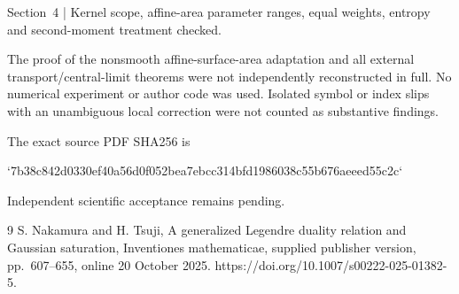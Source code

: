 \documentclass[10pt]{article}
\begin{document}
Section 4 | Kernel scope, affine-area parameter ranges, equal weights, entropy and second-moment treatment checked.\par
The proof of the nonsmooth affine-surface-area adaptation and all external transport/central-limit theorems were not independently reconstructed in full. No numerical experiment or author code was used. Isolated symbol or index slips with an unambiguous local correction were not counted as substantive findings.\par
The exact source PDF SHA256 is\par
`7b38c842d0330ef40a56d0f052bea7ebcc314bfd1986038c55b676aeeed55c2c`\par
Independent scientific acceptance remains pending.\par
9 S. Nakamura and H. Tsuji, A generalized Legendre duality relation and Gaussian saturation, Inventiones mathematicae, supplied publisher version, pp. 607–655, online 20 October 2025. https://doi.org/10.1007/s00222-025-01382-5.\par
\end{document}
